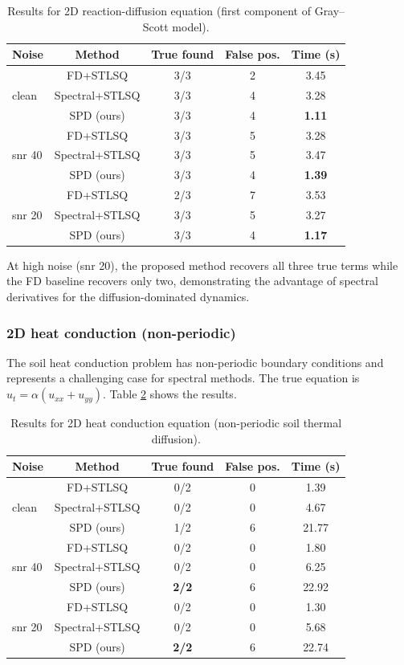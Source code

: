 \documentclass[preprint,12pt]{elsarticle}
\begin{document}
\begin{table}[H]
\centering
\caption{Results for 2D reaction-diffusion equation (first component of Gray--Scott model).}
\label{tab:rd}
\begin{tabular}{lcccc}
\toprule
Noise & Method & True found & False pos. & Time (s) \\
\midrule
\multirow{3}{*}{clean}
& FD+STLSQ & 3/3 & 2 & 3.45 \\
& Spectral+STLSQ & 3/3 & 4 & 3.28 \\
& SPD (ours) & 3/3 & 4 & \textbf{1.11} \\
\midrule
\multirow{3}{*}{snr 40}
& FD+STLSQ & 3/3 & 5 & 3.28 \\
& Spectral+STLSQ & 3/3 & 5 & 3.47 \\
& SPD (ours) & 3/3 & 4 & \textbf{1.39} \\
\midrule
\multirow{3}{*}{snr 20}
& FD+STLSQ & 2/3 & 7 & 3.53 \\
& Spectral+STLSQ & 3/3 & 5 & 3.27 \\
& SPD (ours) & 3/3 & 4 & \textbf{1.17} \\
\bottomrule
\end{tabular}
\end{table}

At high noise (snr 20), the proposed method recovers all three true terms while the FD baseline recovers only two, demonstrating the advantage of spectral derivatives for the diffusion-dominated dynamics.

\subsubsection{2D heat conduction (non-periodic)}

The soil heat conduction problem has non-periodic boundary conditions and represents a challenging case for spectral methods. The true equation is $u_t = \alpha(u_{xx} + u_{yy})$. Table \ref{tab:heat} shows the results.

\begin{table}[H]
\centering
\caption{Results for 2D heat conduction equation (non-periodic soil thermal diffusion).}
\label{tab:heat}
\begin{tabular}{lcccc}
\toprule
Noise & Method & True found & False pos. & Time (s) \\
\midrule
\multirow{3}{*}{clean}
& FD+STLSQ & 0/2 & 0 & 1.39 \\
& Spectral+STLSQ & 0/2 & 0 & 4.67 \\
& SPD (ours) & 1/2 & 6 & 21.77 \\
\midrule
\multirow{3}{*}{snr 40}
& FD+STLSQ & 0/2 & 0 & 1.80 \\
& Spectral+STLSQ & 0/2 & 0 & 6.25 \\
& SPD (ours) & \textbf{2/2} & 6 & 22.92 \\
\midrule
\multirow{3}{*}{snr 20}
& FD+STLSQ & 0/2 & 0 & 1.30 \\
& Spectral+STLSQ & 0/2 & 0 & 5.68 \\
& SPD (ours) & \textbf{2/2} & 6 & 22.74 \\
\bottomrule
\end{tabular}
\end{table}
\end{document}
